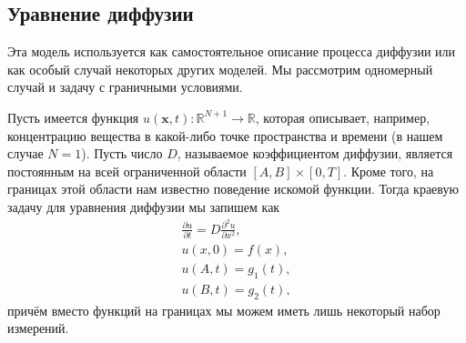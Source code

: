 \documentclass[a4paper, 12pt]{article}
\begin{document}



\subsection{Уравнение диффузии}

Эта модель используется как самостоятельное описание процесса диффузии или как особый случай некоторых других моделей. Мы рассмотрим одномерный случай и задачу с граничными условиями.

Пусть имеется функция $u(\mathbf{x}, t) : \mathbb{R}^{N + 1} \to \mathbb{R}$, которая описывает, например, концентрацию вещества в какой-либо точке пространства и времени (в нашем случае $N = 1$). Пусть число $D$, называемое коэффициентом диффузии, является постоянным на всей ограниченной области $[A, B] \times [0, T]$. Кроме того, на границах этой области нам известно поведение искомой функции. Тогда краевую задачу для уравнения диффузии мы запишем как
\begin{equation} \label{eq:diffusion:problemStatement}
\begin{gathered}
    \frac{\partial u}{\partial t} = D \frac{\partial^2 u}{\partial x^2}, \\
    u(x, 0) = f(x), \\
    u(A, t) = g_1(t), \\
    u(B, t) = g_2(t),
\end{gathered}
\end{equation}
причём вместо функций на границах мы можем иметь лишь некоторый набор измерений.
\end{document}

